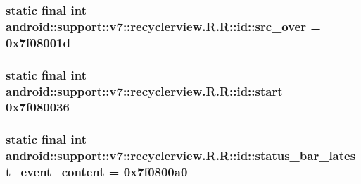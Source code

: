 \hypertarget{classandroid_1_1support_1_1v7_1_1recyclerview_1_1_r_1_1id_4a3780682c582a797c1b3cafed345233}{
\subsubsection[{src\_\-over}]{\setlength{\rightskip}{0pt plus 5cm}static final int android::support::v7::recyclerview.R.R::id::src\_\-over = 0x7f08001d}}
\label{classandroid_1_1support_1_1v7_1_1recyclerview_1_1_r_1_1id_4a3780682c582a797c1b3cafed345233}


\hypertarget{classandroid_1_1support_1_1v7_1_1recyclerview_1_1_r_1_1id_30cd3f71322c010dc679a0cabc04ff18}{
\subsubsection[{start}]{\setlength{\rightskip}{0pt plus 5cm}static final int android::support::v7::recyclerview.R.R::id::start = 0x7f080036}}
\label{classandroid_1_1support_1_1v7_1_1recyclerview_1_1_r_1_1id_30cd3f71322c010dc679a0cabc04ff18}


\hypertarget{classandroid_1_1support_1_1v7_1_1recyclerview_1_1_r_1_1id_b0f056de4e4f6b07ccb475868499e2f1}{
\subsubsection[{status\_\-bar\_\-latest\_\-event\_\-content}]{\setlength{\rightskip}{0pt plus 5cm}static final int android::support::v7::recyclerview.R.R::id::status\_\-bar\_\-latest\_\-event\_\-content = 0x7f0800a0}}
\label{classandroid_1_1support_1_1v7_1_1recyclerview_1_1_r_1_1id_b0f056de4e4f6b07ccb475868499e2f1}


